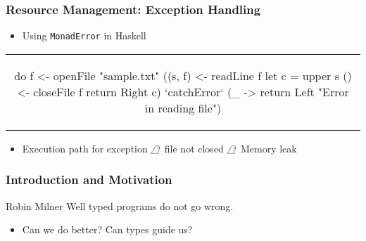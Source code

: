 \begin{frame}[fragile, c]
  \frametitle{Resource Management: Exception Handling}
  \begin{center}

  \begin{itemize}
  \item Using \texttt{MonadError} in Haskell
  \end{itemize}
  \begin{tabular}[h]{c}
    \begin{haskell}
      do f <- openFile "sample.txt"
         ((s, f)  <- readLine f
         let c = upper s
         () <- closeFile f
         return \dollar Right c) `catchError` (\_ ->
                             return \dollar Left "Error in reading file")
     \end{haskell}
  \end{tabular}
  \begin{itemize}
  \item Execution path for exception $\mathrightghost$ file not closed $\mathrightghost$ Memory leak
  \end{itemize}
  \end{center}
\end{frame}

\begin{frame}
  \frametitle{Introduction and Motivation}
  \begin{aquote}{Robin Milner}
      Well typed programs do not go wrong.
  \end{aquote}

    \begin{itemize}
    \item<2-> Can we do better? Can types guide us?
  \end{itemize}
\end{frame}
